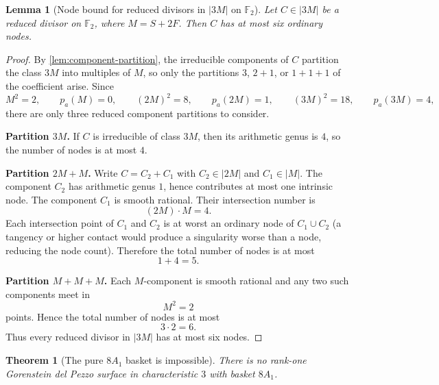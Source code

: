 \documentclass[11pt]{article}
\newtheorem{theorem}{Theorem}[section]
\newtheorem{lemma}[lemma]{Lemma}
\theoremstyle{definition}
\begin{document}
\begin{lemma}[Node bound for reduced divisors in $|3M|$ on $\mathbb F_2$]\label{lem:node-bound}
Let $C\in |3M|$ be a reduced divisor on $\mathbb F_2$, where $M=S+2F$. Then $C$ has at most six ordinary nodes.
\end{lemma}

\begin{proof}
By \cref{lem:component-partition}, the irreducible components of $C$ partition the class $3M$ into multiples of $M$, so only the partitions $3$, $2+1$, or $1+1+1$ of the coefficient arise. Since
\[
M^2=2,
\qquad
p_a(M)=0,
\qquad
(2M)^2=8,
\qquad
p_a(2M)=1,
\qquad
(3M)^2=18,
\qquad
p_a(3M)=4,
\]
there are only three reduced component partitions to consider.

\medskip
\noindent
\textbf{Partition $3M$.}
If $C$ is irreducible of class $3M$, then its arithmetic genus is $4$, so the number of nodes is at most $4$.

\medskip
\noindent
\textbf{Partition $2M+M$.}
Write $C=C_2+C_1$ with $C_2\in |2M|$ and $C_1\in |M|$. The component $C_2$ has arithmetic genus $1$, hence contributes at most one intrinsic node. The component $C_1$ is smooth rational. Their intersection number is
\[
(2M)\cdot M=4.
\]
Each intersection point of $C_1$ and $C_2$ is at worst an ordinary node of $C_1\cup C_2$ (a tangency or higher contact would produce a singularity worse than a node, reducing the node count). Therefore the total number of nodes is at most
\[
1+4=5.
\]

\medskip
\noindent
\textbf{Partition $M+M+M$.}
Each $M$-component is smooth rational and any two such components meet in
\[
M^2=2
\]
points. Hence the total number of nodes is at most
\[
3\cdot 2=6.
\]
Thus every reduced divisor in $|3M|$ has at most six nodes.
\end{proof}

\begin{theorem}[The pure $8A_1$ basket is impossible]\label{thm:pure8a1-impossible}
There is no rank-one Gorenstein del Pezzo surface in characteristic $3$ with basket $8A_1$.
\end{theorem}
\end{document}
